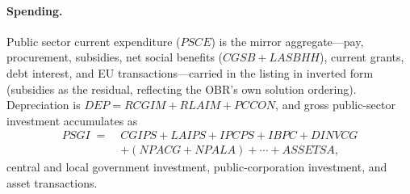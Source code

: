 \paragraph{Spending.} Public sector current expenditure ($PSCE$) is the mirror aggregate---pay, procurement, subsidies, net social benefits ($CGSB + LASBHH$), current grants, debt interest, and EU transactions---carried in the listing in inverted form (subsidies as the residual, reflecting the OBR's own solution ordering). Depreciation is $DEP = RCGIM + RLAIM + PCCON$, and gross public-sector investment accumulates as
\begin{equation}
\begin{aligned}
PSGI \;=\;& CGIPS + LAIPS + IPCPS + IBPC + DINVCG \\
&+ (NPACG + NPALA) + \cdots + ASSETSA,
\end{aligned}
\label{eq:psgi}
\end{equation}
central and local government investment, public-corporation investment, and asset transactions.

